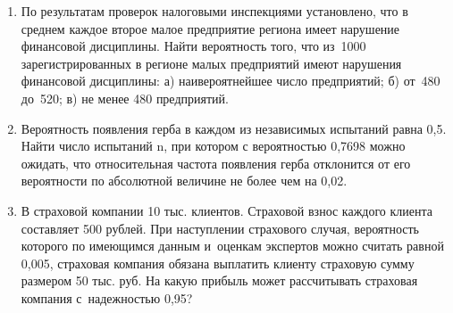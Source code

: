\documentclass[a4paper,14pt]{extarticle}
\begin{document}
{\begin{enumerate}



\item По результатам проверок налоговыми инспекциями установлено, что в среднем каждое второе малое предприятие региона имеет нарушение финансовой дисциплины. Найти вероятность того, что из~1000 зарегистрированных в регионе малых предприятий имеют нарушения финансовой дисциплины: а) наивероятнейшее число предприятий; б) от~480 до~520; в) не менее 480 предприятий.



\item Вероятность появления герба в каждом из независимых испытаний равна 0,5. Найти число испытаний n, при котором с вероятностью 0,7698 можно ожидать, что относительная частота появления герба отклонится от его вероятности по абсолютной величине не более чем на 0,02.




\item В страховой компании 10 тыс. клиентов. Страховой взнос каждого клиента составляет 500 рублей. При наступлении страхового случая, вероятность которого по имеющимся данным и~оценкам экспертов можно считать равной 0,005, страховая компания обязана выплатить клиенту страховую сумму размером 50 тыс. руб. На какую прибыль может рассчитывать страховая компания с~надежностью 0,95?



\end{enumerate}}
\end{document}
